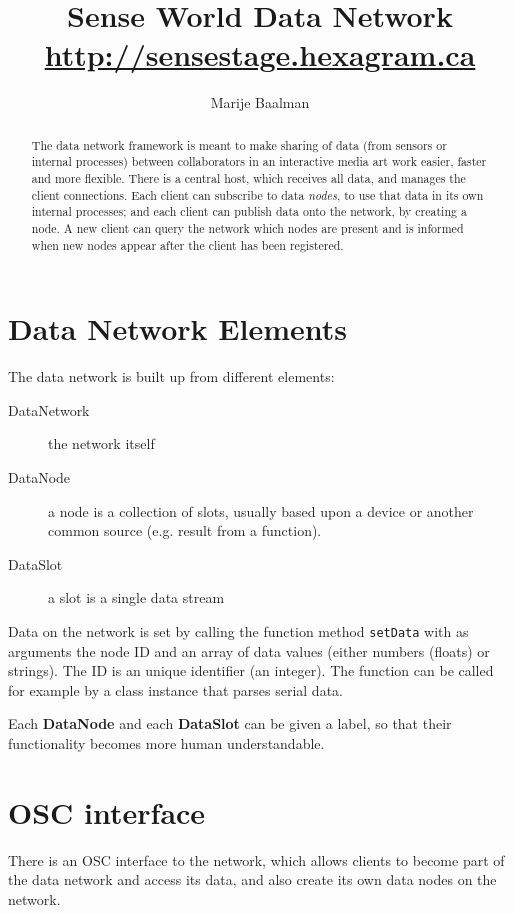 \documentclass[letterpaper,10pt]{article}
\title{Sense World Data Network\\ \url{http://sensestage.hexagram.ca} }
\author{Marije Baalman}
\begin{document}

\maketitle

\begin{abstract}
The data network framework is meant to make sharing of data (from sensors or internal processes) between collaborators in an interactive media art work easier, faster and more flexible. There is a central host, which receives all data, and manages the client connections. Each client can subscribe to data \textit{nodes}, to use that data in its own internal processes; and each client can publish data onto the network, by creating a node. A new client can query the network which nodes are present and is informed when new nodes appear after the client has been registered.
\end{abstract}

\section{Data Network Elements}

The data network is built up from different elements:
\begin{description}
 \item [DataNetwork] the network itself
 \item [DataNode] a node is a collection of slots, usually based upon a device or another common source (e.g. result from a function).
 \item [DataSlot] a slot is a single data stream
\end{description}

Data on the network is set by calling the function method \verb|setData| with as arguments the node ID and an array of data values (either numbers (floats) or strings). The ID is an unique identifier (an integer). The function can be called for example by a class instance that parses serial data.

Each \textbf{DataNode} and each \textbf{DataSlot} can be given a label, so that their functionality becomes more human understandable.

\section{OSC interface}
There is an OSC interface to the network, which allows clients to become part of the data network and access its data, and also create its own data nodes on the network.
\end{document}
